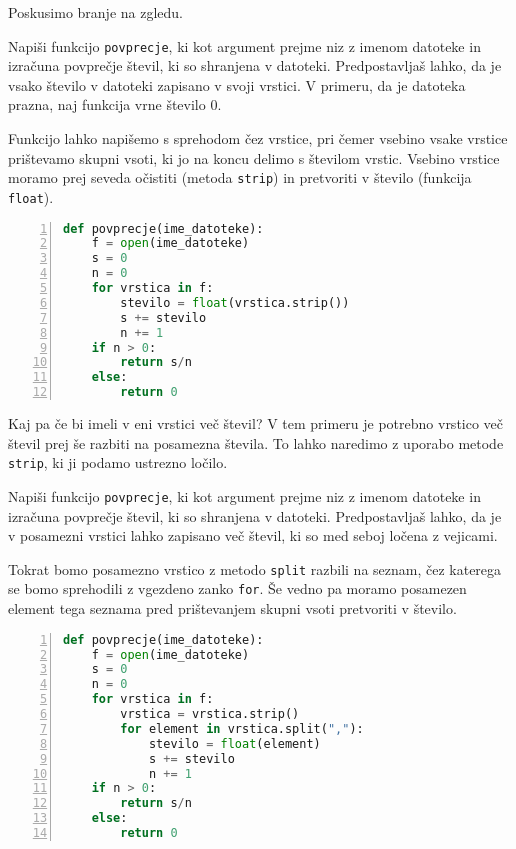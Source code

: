 Poskusimo branje na zgledu.
\begin{zgled}
Napiši funkcijo \texttt{povprecje}, ki kot argument prejme niz z imenom datoteke in izračuna povprečje števil, ki so shranjena v datoteki. Predpostavljaš lahko, da je vsako število v datoteki zapisano v svoji vrstici. V primeru, da je datoteka prazna, naj funkcija vrne število 0.
\end{zgled}
\begin{resitev}
Funkcijo lahko napišemo s sprehodom čez vrstice, pri čemer vsebino vsake vrstice prištevamo skupni vsoti, ki jo na koncu delimo s številom vrstic. Vsebino vrstice moramo prej seveda očistiti (metoda \texttt{strip}) in pretvoriti v število (funkcija \texttt{float}). 
\begin{lstlisting}[language=Python, showstringspaces=false,numbers=left]
def povprecje(ime_datoteke):
    f = open(ime_datoteke)
    s = 0
    n = 0
    for vrstica in f:
        stevilo = float(vrstica.strip())
        s += stevilo
        n += 1
    if n > 0:
        return s/n
    else:
        return 0
\end{lstlisting}
\end{resitev}

Kaj pa če bi imeli v eni vrstici več števil? V tem primeru je potrebno vrstico več števil prej še razbiti na posamezna števila. To lahko naredimo z uporabo metode \texttt{strip}, ki ji podamo ustrezno ločilo.

\begin{zgled}
Napiši funkcijo \texttt{povprecje}, ki kot argument prejme niz z imenom datoteke in izračuna povprečje števil, ki so shranjena v datoteki. Predpostavljaš lahko, da je v posamezni vrstici lahko zapisano več števil, ki so med seboj ločena z vejicami.
\end{zgled}
\begin{resitev}
Tokrat bomo posamezno vrstico z metodo \texttt{split} razbili na seznam, čez katerega se bomo sprehodili z vgezdeno zanko \texttt{for}. Še vedno pa moramo posamezen element tega seznama pred prištevanjem skupni vsoti pretvoriti v število.
\begin{lstlisting}[language=Python, showstringspaces=false,numbers=left]
def povprecje(ime_datoteke):
    f = open(ime_datoteke)
    s = 0
    n = 0
    for vrstica in f:
        vrstica = vrstica.strip()
        for element in vrstica.split(","):
            stevilo = float(element)
            s += stevilo    
            n += 1
    if n > 0:
        return s/n
    else:
        return 0
\end{lstlisting}
\end{resitev}
